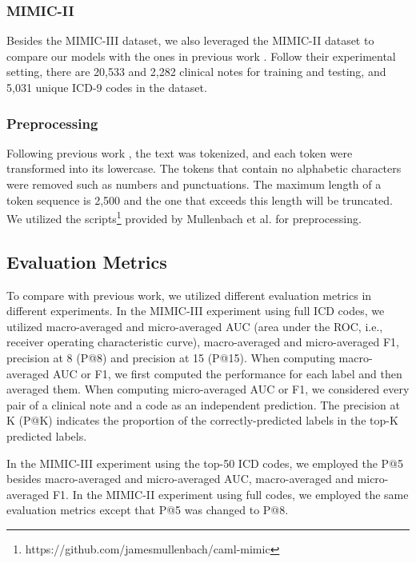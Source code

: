 \documentclass[letterpaper]{article} \usepackage{aaai20}  \usepackage{times}  \usepackage{helvet} \usepackage{courier}  \usepackage[hyphens]{url}  \usepackage{graphicx} \urlstyle{rm} \def\UrlFont{\rm}  \usepackage{graphicx}  \frenchspacing  \setlength{\pdfpagewidth}{8.5in}  \setlength{\pdfpageheight}{11in}
\begin{document}
\subsubsection{MIMIC-II}
Besides the MIMIC-III dataset, we also leveraged the MIMIC-II dataset to compare our models with the ones in previous work \cite{perotte2013diagnosis,mullenbach2018explainable,baumel2018multi}. Follow their experimental setting, there are 20,533 and 2,282 clinical notes for training and testing, and 5,031 unique ICD-9 codes in the dataset.

\subsubsection{Preprocessing}
Following previous work \cite{mullenbach2018explainable}, the text was tokenized, and each token were transformed into its lowercase. The tokens that contain no alphabetic characters were removed such as numbers and punctuations. The maximum length of a token sequence is 2,500 and the one that exceeds this length will be truncated. We utilized the scripts\footnote{https://github.com/jamesmullenbach/caml-mimic} provided by Mullenbach et al.  for preprocessing.

\subsection{Evaluation Metrics}

To compare with previous work, we utilized different evaluation metrics in different experiments. In the MIMIC-III experiment using full ICD codes, we utilized macro-averaged and micro-averaged AUC (area under the ROC, i.e., receiver operating characteristic curve), macro-averaged and micro-averaged F1, precision at 8 (P@8) and precision at 15 (P@15). When computing macro-averaged AUC or F1, we first computed the performance for each label and then averaged them. When computing micro-averaged AUC or F1, we considered every pair of a clinical note and a code as an independent prediction. The precision at K (P@K) indicates the proportion of the correctly-predicted labels in the top-K predicted labels. 

In the MIMIC-III experiment using the top-50 ICD codes, we employed the P@5 besides macro-averaged and micro-averaged AUC, macro-averaged and micro-averaged F1. In the MIMIC-II experiment using full codes, we employed the same evaluation metrics except that P@5 was changed to P@8.
\end{document}
